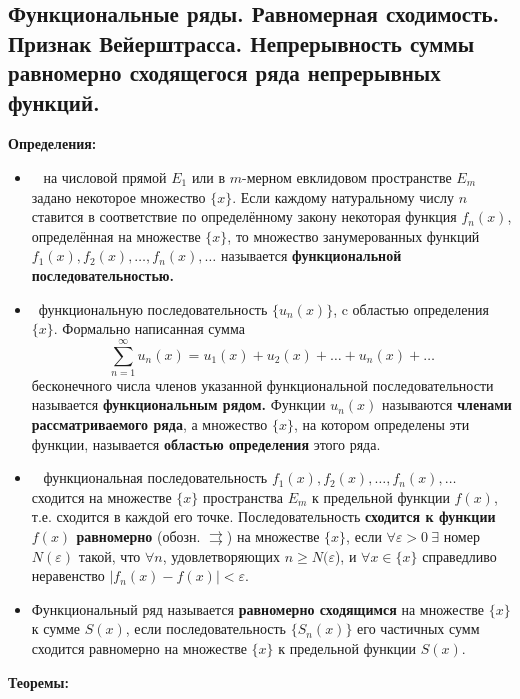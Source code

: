 \subsection{Функциональные ряды. Равномерная сходимость. Признак Вейерштрасса. Непрерывность суммы  равномерно сходящегося ряда непрерывных функций.}

\textbf{Определения:}
\begin{itemize}
    \item \mathLet ~ на числовой прямой $E_1$ или в $m$-мерном евклидовом пространстве $E_m$ задано некоторое множество $\{x\}$.
    Если каждому натуральному числу $n$ ставится в соответствие по определённому закону некоторая функция $f_n(x)$, определённая на множестве $\{x\}$, то множество занумерованных функций $f_1(x),f_2(x),\dots,f_n(x),\dots$ называется \textbf{функциональной последовательностью.}
    
    \item \faEye \ функциональную последовательность $\{u_n(x)\}$, c областью определения $\{x\}$.
    Формально написанная сумма
    $$\displaystyle \sum_{n=1}^{\infty} u_n(x) = u_1(x) + u_2(x) + \dots + u_n(x) + \dots$$
    бесконечного числа членов указанной функциональной последовательности называется \textbf{функциональным рядом.}
    Функции $u_n(x)$ называются \textbf{членами рассматриваемого ряда}, а множество $\{x\}$, на котором определены эти функции, называется \textbf{областью определения} этого ряда.
    
    \item  \mathLet ~ функциональная последовательность
    $f_1(x), f_2(x), \dots, f_n(x), \dots$ сходится на множестве $\{x\}$ пространства $E_m$ к предельной функции $f(x)$, т.е. сходится в каждой его точке.
    Последовательность \textbf{сходится к функции $f(x)$ равномерно} (обозн. $\rightrightarrows$) на множестве $\{x\}$, если $\forall \varepsilon > 0 ~ \exists$ номер $N(\varepsilon)$ такой, что $\forall n$, удовлетворяющих $n \geqslant N(\varepsilon$), и $\forall x \in \{x\}$ справедливо неравенство $|f_n(x) - f(x)| < \varepsilon$.
    
    \item Функциональный ряд называется \textbf{равномерно сходящимся} на множестве $\{x\}$ к сумме $S(x)$, если последовательность $\{S_n(x)\}$ его частичных сумм сходится равномерно на множестве $\{x\}$ к предельной функции $S(x)$.

\end{itemize}


\textbf{Теоремы:}


